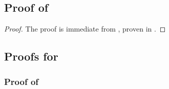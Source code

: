 \documentclass{article} %
\begin{document}
\subsection{Proof of }
\begin{proof} 
The proof is immediate from , proven in .
\end{proof}

\subsection{Proofs for }\label{sec:finite_sample_proofs}

\subsubsection{Proof of }
\end{document}
